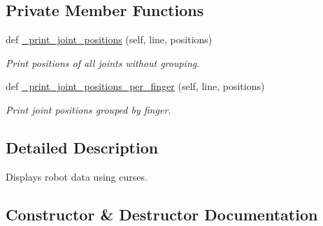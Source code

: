 \subsection*{Private Member Functions}
\begin{DoxyCompactItemize}
\item 
\mbox{\label{classposition__control__on__off_1_1CursesGUI_a54946c3214fa5cd6bbfce7f5d55fb49b}} 
def \hyperlink{classposition__control__on__off_1_1CursesGUI_a54946c3214fa5cd6bbfce7f5d55fb49b}{\+\_\+print\+\_\+joint\+\_\+positions} (self, line, positions)
\begin{DoxyCompactList}\small\item\em Print positions of all joints without grouping. \end{DoxyCompactList}\item 
\mbox{\label{classposition__control__on__off_1_1CursesGUI_a589ea0a35d818c60babdb761db5a2a0d}} 
def \hyperlink{classposition__control__on__off_1_1CursesGUI_a589ea0a35d818c60babdb761db5a2a0d}{\+\_\+print\+\_\+joint\+\_\+positions\+\_\+per\+\_\+finger} (self, line, positions)
\begin{DoxyCompactList}\small\item\em Print joint positions grouped by finger. \end{DoxyCompactList}\end{DoxyCompactItemize}


\subsection{Detailed Description}
Displays robot data using curses. 



\subsection{Constructor \& Destructor Documentation}
\mbox{\label{classposition__control__on__off_1_1CursesGUI_ae9ed34431bd6f151277dbcce612f4ade}} 
